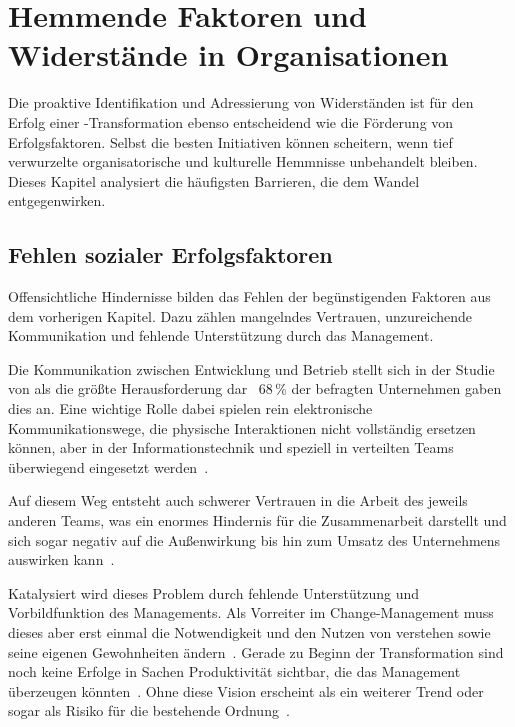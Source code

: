 \chapter{Hemmende Faktoren und Widerstände in Organisationen}
\label{ch:barriers}

Die proaktive Identifikation und Adressierung von Widerständen ist für den Erfolg einer \DO-Transformation ebenso entscheidend wie die Förderung von Erfolgsfaktoren.
Selbst die besten Initiativen können scheitern, wenn tief verwurzelte organisatorische und kulturelle Hemmnisse unbehandelt bleiben.
Dieses Kapitel analysiert die häufigsten Barrieren, die dem Wandel entgegenwirken.

\section{Fehlen sozialer Erfolgsfaktoren}
Offensichtliche Hindernisse bilden das Fehlen der begünstigenden Faktoren aus dem vorherigen Kapitel.
Dazu zählen mangelndes Vertrauen, unzureichende Kommunikation und fehlende Unterstützung durch das Management.

Die Kommunikation zwischen Entwicklung und Betrieb stellt sich in der Studie von \textcite[14343]{kha22} als die größte Herausforderung dar \textendash\ 68\,\% der befragten Unternehmen gaben dies an.
Eine wichtige Rolle dabei spielen rein elektronische Kommunikationswege, die physische Interaktionen nicht vollständig ersetzen können, aber in der Informationstechnik und speziell in verteilten Teams überwiegend eingesetzt werden~\cite[594]{riu16}.

Auf diesem Weg entsteht auch schwerer Vertrauen in die Arbeit des jeweils anderen Teams, was ein enormes Hindernis für die Zusammenarbeit darstellt und sich sogar negativ auf die Außenwirkung bis hin zum Umsatz des Unternehmens auswirken kann~\cite[14343]{kha22}.

Katalysiert wird dieses Problem durch fehlende Unterstützung und Vorbildfunktion des Managements.
Als Vorreiter im Change-Management muss dieses aber erst einmal die Notwendigkeit und den Nutzen von \DO verstehen sowie seine eigenen Gewohnheiten ändern~\cite[285]{kar24}.
Gerade zu Beginn der Transformation sind noch keine Erfolge in Sachen Produktivität sichtbar, die das Management überzeugen könnten~\cite[128]{ham24}.
Ohne diese Vision erscheint \DO als ein weiterer Trend oder sogar als Risiko für die bestehende Ordnung~\cite[284]{kar24}.

